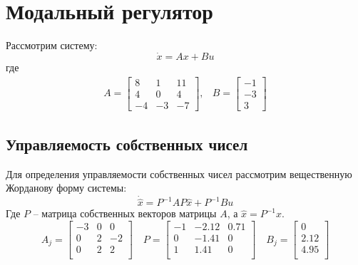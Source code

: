 \section{Модальный регулятор}
Рассмотрим систему: 
\begin{equation}
    \dot{x} = Ax + Bu
\end{equation}
где 
\begin{equation}
    \begin{array}{cc}
        A = \begin{bmatrix}
            8 & 1 & 11 \\ 
            4 & 0 & 4 \\
            -4 & -3 & -7
        \end{bmatrix}, &
        B = \begin{bmatrix}
            -1 \\ -3 \\ 3
        \end{bmatrix}
    \end{array}
\end{equation}

\subsection{Управляемость собственных чисел}

Для определения управляемости собственных чисел рассмотрим вещественную Жорданову форму системы: 
\begin{equation}
    \dot{\hat{x}} = P^{-1}AP\hat{x} + P^{-1}Bu
\end{equation}
Где $P$ -- матрица собственных векторов матрицы $A$, а $\hat{x} = P^{-1}x$.
\begin{equation}
    A_j = \begin{bmatrix}
        -3  & 0  & 0 \\ 
        0  & 2  & -2 \\ 
        0  & 2  & 2 \\ 
    \end{bmatrix}\quad
    P = \begin{bmatrix}
        -1  & -2.12  & 0.71 \\ 
        0  & -1.41  & 0 \\ 
        1  & 1.41  & 0 \\ 
    \end{bmatrix}\quad 
    B_j = \begin{bmatrix}
        0 \\ 
        2.12 \\ 
        4.95 \\ 
    \end{bmatrix}
\end{equation}

